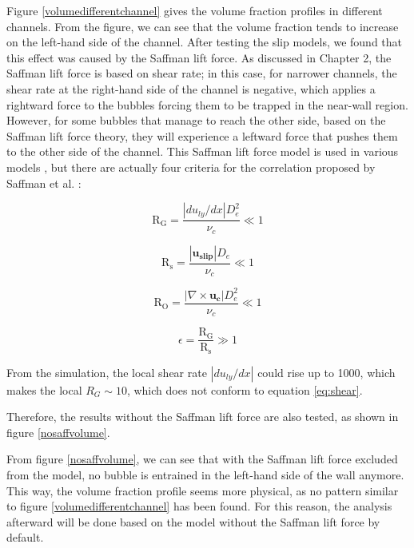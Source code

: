 Figure \ref{volumedifferentchannel} gives the volume fraction profiles in different channels. From the figure, we can see that the volume fraction tends to increase on the left-hand side of the channel. After testing the slip models, we found that this effect was caused by the Saffman lift force. As discussed in Chapter 2, the Saffman lift force is based on shear rate; in this case, for narrower channels, the shear rate at the right-hand side of the channel is negative, which applies a rightward force to the bubbles forcing them to be trapped in the near-wall region. However, for some bubbles that manage to reach the other side, based on the Saffman lift force theory, they will experience a leftward force that pushes them to the other side of the channel. This Saffman lift force model is used in various models \cite{Wetind2001, Dahlkild2001, Schillings2015}, but there are actually four criteria for the correlation proposed by Saffman et al. \cite{saffman1965lift}:

\begin{equation}\label{eq:shear}
    \mathrm{R_{G}}  = \frac{|du_{ly}/dx|D_e^2}{\nu_c} \ll 1
\end{equation}

\begin{equation}
    \mathrm{R_{s}} = \frac{|\mathbf{u_{slip}}|D_e}{\nu_c} \ll 1
\end{equation}

\begin{equation}
    \mathrm{R_{O}} = \frac{|\nabla \times \mathbf{u_c}|D_e^2}{\nu_c} \ll 1
\end{equation}

\begin{equation}
    \epsilon = \frac{\mathrm{R_{G}}}{\mathrm{R_{s}}} \gg 1
\end{equation}

From the simulation, the local shear rate $|du_{ly}/dx|$ could rise up to 1000, which makes the local $R_{G} \sim 10$, which does not conform to equation \ref{eq:shear}. 

Therefore, the results without the Saffman lift force are also tested, as shown in figure \ref{nosaffvolume}.

From figure \ref{nosaffvolume}, we can see that with the Saffman lift force excluded from the model, no bubble is entrained in the left-hand side of the wall anymore. This way, the volume fraction profile seems more physical, as no pattern similar to figure \ref{volumedifferentchannel} has been found. For this reason, the analysis afterward will be done based on the model without the Saffman lift force by default.




